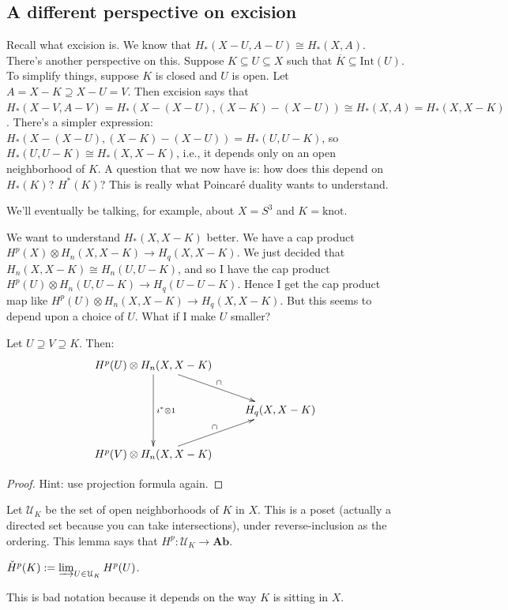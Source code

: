 \subsection{A different perspective on excision}
Recall what excision is. We know that $ H_\ast(X-U,A-U)\cong H_\ast(X,A)$. There's another perspective on this. Suppose $K\subseteq U\subseteq X$ such that $\overline{K}\subseteq\mathrm{Int}(U)$. To simplify things, suppose $K$ is closed and $U$ is open. Let $A=X-K\supseteq X-U=V$. Then excision says that $ H_\ast(X-V,A-V)= H_\ast(X-(X-U),(X-K)-(X-U))\cong H_\ast(X,A)= H_\ast(X,X-K)$. There's a simpler expression: $ H_\ast(X-(X-U),(X-K)-(X-U))= H_\ast(U,U-K)$, so $ H_\ast(U,U-K)\cong H_\ast(X,X-K)$, i.e., it depends only on an open neighborhood of $K$. A question that we now have is: how does this depend on $ H_\ast(K)$? $ H^\ast(K)$? This is really what Poincar\'{e} duality wants to understand.
\begin{example}
We'll eventually be talking, for example, about $X=S^3$ and $K=\text{knot}$.
\end{example}
We want to understand $ H_\ast(X,X-K)$ better. We have a cap product $ H^p(X)\otimes H_n(X,X-K)\to H_q(X,X-K)$. We just decided that $ H_n(X,X-K)\cong H_n(U,U-K)$, and so I have the cap product $ H^p(U)\otimes H_n(U,U-K)\to H_q(U-U-K)$. Hence I get the cap product map like $ H^p(U)\otimes H_n(X,X-K)\to H_q(X,X-K)$. But this seems to depend upon a choice of $U$. What if I make $U$ smaller?
\begin{lemma}
Let $U\supseteq V\supseteq K$. Then:
\begin{equation*}
\xymatrix{
	 H^p(U)\ar[dd]^{i^\ast\otimes 1}\otimes H_n(X,X-K)\ar[dr]^\cap & \\
	 & H_q(X,X-K)\\
	 H^p(V)\otimes H_n(X,X-K)\ar[ur]^\cap
}
\end{equation*}
\end{lemma}
\begin{proof}
Hint: use projection formula again.
\end{proof}
Let $\mathcal{U}_K$ be the set of open neighborhoods of $K$ in $X$. This is a poset (actually a directed set because you can take intersections), under reverse-inclusion as the ordering. This lemma says that $ H^p:\mathcal{U}_K\to\mathbf{Ab}$.
\begin{definition}
$\check{H}^p(K):=\varinjlim_{U\in\mathcal{U}_K} H^p(U)$.
\end{definition}
This is bad notation because it depends on the way $K$ is sitting in $X$.

